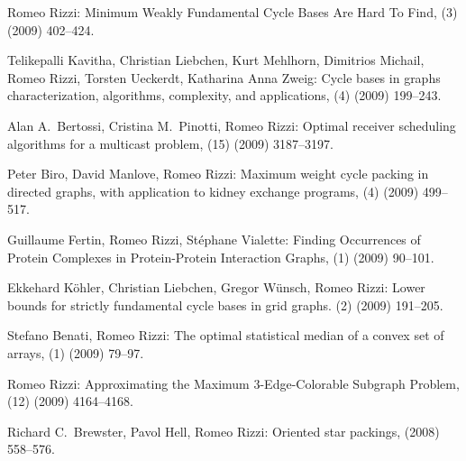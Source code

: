 \begin{etaremune}
  \item {\sc Romeo Rizzi:}
   \newblock   Minimum Weakly Fundamental Cycle Bases Are Hard To Find,
   (3) (2009) 402--424.

  \item {\sc Telikepalli Kavitha, Christian Liebchen, Kurt Mehlhorn, Dimitrios Michail, Romeo Rizzi, Torsten Ueckerdt, Katharina Anna Zweig:}
   \newblock  Cycle bases in graphs characterization, algorithms, complexity, and applications,
   (4) (2009) 199--243.

  \item {\sc Alan A.~Bertossi, Cristina M.~Pinotti, Romeo Rizzi:}
   \newblock  Optimal receiver scheduling algorithms for a multicast problem,
   (15) (2009) 3187--3197.

  \item {\sc Peter Biro, David Manlove, Romeo Rizzi:}
   \newblock   Maximum weight cycle packing in directed graphs, with application to kidney exchange programs,
   (4) (2009) 499--517.

  \item {\sc Guillaume Fertin, Romeo Rizzi, St\'ephane Vialette:}
   \newblock  Finding Occurrences of Protein
              Complexes in Protein-Protein Interaction Graphs,
   (1) (2009) 90--101.

  \item {\sc Ekkehard K\"ohler, Christian Liebchen, Gregor W\"unsch, Romeo Rizzi:}
   \newblock  Lower bounds for strictly fundamental cycle bases in grid graphs.    
   (2) (2009) 191--205.

  \item {\sc Stefano Benati, Romeo Rizzi:}
   \newblock   The optimal statistical median of a convex set of arrays,
   (1) (2009) 79--97.

  \item {\sc Romeo Rizzi:}
   \newblock   Approximating the Maximum $3$-Edge-Colorable Subgraph Problem,
   (12) (2009) 4164--4168.

  \item {\sc Richard C.~Brewster, Pavol Hell, Romeo Rizzi:}
   \newblock  Oriented star packings,
    (2008) 558--576.


\end{etaremune}
